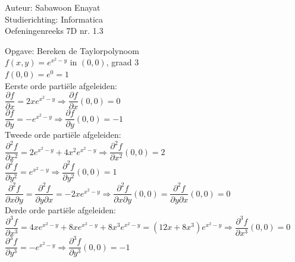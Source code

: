 \documentclass[a4paper]{article}
\begin{document}
  
\noindent \large Auteur: Sabawoon Enayat      \\
\noindent \large Studierichting: Informatica  \\
\noindent \large Oefeningenreeks 7D nr. 1.3   \\

\newcommand{\llim}{\lim\limits}

\medskip

\normalsize

Opgave: Bereken de Taylorpolynoom\\

$f(x, y) = e^{x^2 - y}$ in $(0, 0)$, graad $3$\\

$f(0, 0) = e^0 = 1$\\

Eerste orde parti\"ele afgeleiden:\\

$\dfrac{\partial f}{\partial x} = 2xe^{x^2 - y} \Rightarrow \dfrac{\partial f}{\partial x}(0, 0) = 0$\\

$\dfrac{\partial f}{\partial y} = -e^{x^2 - y} \Rightarrow \dfrac{\partial f}{\partial y}(0, 0) = -1$\\

Tweede orde parti\"ele afgeleiden:\\

$\dfrac{\partial^2 f}{\partial x^2} = 2e^{x^2 - y} + 4x^2 e^{x^2 - y} \Rightarrow \dfrac{\partial^2 f}{\partial x^2}(0, 0) = 2$\\

$\dfrac{\partial^2 f}{\partial y^2} = e^{x^2 - y} \Rightarrow \dfrac{\partial^2 f}{\partial y^2}(0, 0) = 1$\\

$\dfrac{\partial^2 f}{\partial x\partial y} = \dfrac{\partial^2 f}{\partial y\partial x} = -2xe^{x^2 - y} \Rightarrow \dfrac{\partial^2 f}{\partial x\partial y}(0, 0) = \dfrac{\partial^2 f}{\partial y\partial x}(0, 0) = 0$\\

Derde orde parti\"ele afgeleiden:\\

$\dfrac{\partial^3 f}{\partial x^3} = 4xe^{x^2 - y} + 8xe^{x^2 - y} + 8x^3 e^{x^2 - y} = \left(12x + 8x^3\right)e^{x^2 - y} \Rightarrow \dfrac{\partial^3 f}{\partial x^3}(0, 0) = 0$\\

$\dfrac{\partial^3 f}{\partial y^3} = -e^{x^2 - y} \Rightarrow \dfrac{\partial^3 f}{\partial y^3}(0, 0) = -1$\\
\end{document}
